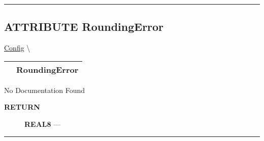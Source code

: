 \rule{\linewidth}{0.5pt}
\subsection*{\textsf{\colorbox{headtoc}{\color{white} ATTRIBUTE}
RoundingError}}

\hypertarget{ecldoc:ml_core.config.roundingerror}{}
\hspace{0pt} \hyperlink{ecldoc:ML_Core.Config}{Config} \textbackslash 

{\renewcommand{\arraystretch}{1.5}
\begin{tabularx}{\textwidth}{|>{\raggedright\arraybackslash}l|X|}
\hline
\hspace{0pt}\mytexttt{\color{red} } & \textbf{RoundingError} \\
\hline
\end{tabularx}
}

\par





No Documentation Found








\par
\begin{description}
\item [\colorbox{tagtype}{\color{white} \textbf{\textsf{RETURN}}}] \textbf{REAL8} --- 
\end{description}




\rule{\linewidth}{0.5pt}


